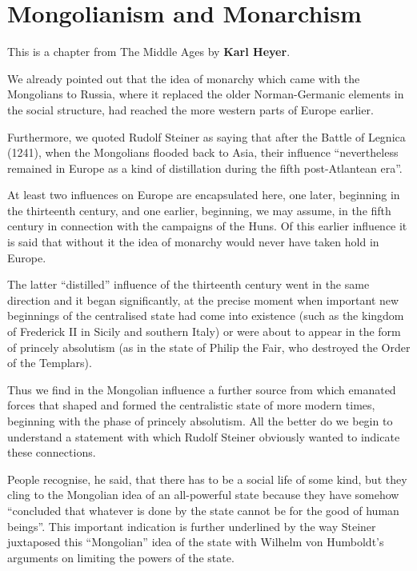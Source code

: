 \section{Mongolianism and Monarchism}

\begin{quotex}
This is a chapter from The Middle Ages by \textbf{Karl Heyer}.
\end{quotex}

We already pointed out that the idea of monarchy which came with the Mongolians to Russia, where it replaced the older Norman-Germanic elements in the social structure, had reached the more western parts of Europe earlier.

Furthermore, we quoted Rudolf Steiner as saying that after the Battle of Legnica (1241), when the Mongolians flooded back to Asia, their influence ``nevertheless remained in Europe as a kind of distillation during the fifth post-Atlantean era''.

At least two influences on Europe are encapsulated here, one later, beginning in the thirteenth century, and one earlier, beginning, we may assume, in the fifth century in connection with the campaigns of the Huns. Of this earlier influence it is said that without it the idea of monarchy would never have taken hold in Europe.

The latter ``distilled'' influence of the thirteenth century went in the same direction and it began significantly, at the precise moment when important new beginnings of the centralised state had come into existence (such as the kingdom of Frederick II in Sicily and southern Italy) or were about to appear in the form of princely absolutism (as in the state of Philip the Fair, who destroyed the Order of the Templars).

Thus we find in the Mongolian influence a further source from which emanated forces that shaped and formed the centralistic state of more modern times, beginning with the phase of princely absolutism. All the better do we begin to understand a statement with which Rudolf Steiner obviously wanted to indicate these connections.

People recognise, he said, that there has to be a social life of some kind, but they cling to the Mongolian idea of an all-powerful state because they have somehow ``concluded that whatever is done by the state cannot be for the good of human beings''. This important indication is further underlined by the way Steiner juxtaposed this ``Mongolian'' idea of the state with Wilhelm von Humboldt's arguments on limiting the powers of the state.


